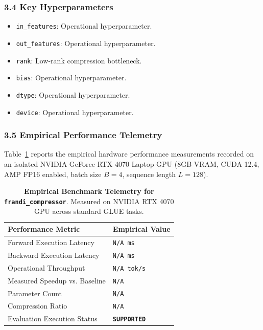 \subsubsection*{3.4 Key Hyperparameters}
\begin{itemize}
    \item \texttt{in\_features}: Operational hyperparameter.
    \item \texttt{out\_features}: Operational hyperparameter.
    \item \texttt{rank}: Low-rank compression bottleneck.
    \item \texttt{bias}: Operational hyperparameter.
    \item \texttt{dtype}: Operational hyperparameter.
    \item \texttt{device}: Operational hyperparameter.
\end{itemize}

\subsubsection*{3.5 Empirical Performance Telemetry}
Table~\ref{tab:telemetry_frandi\_compressor} reports the empirical hardware performance measurements recorded on an isolated NVIDIA GeForce RTX 4070 Laptop GPU (8GB VRAM, CUDA 12.4, AMP FP16 enabled, batch size $B=4$, sequence length $L=128$).

\begin{table}[h]
\centering
\small
\caption{\textbf{Empirical Benchmark Telemetry for \texttt{frandi\_compressor}}. Measured on NVIDIA RTX 4070 GPU across standard GLUE tasks.}
\label{tab:telemetry_frandi\_compressor}
\begin{tabularx}{\columnwidth}{lX}
\toprule
\textbf{Performance Metric} & \textbf{Empirical Value} \\
\midrule
Forward Execution Latency & \texttt{N/A ms} \\
Backward Execution Latency & \texttt{N/A ms} \\
Operational Throughput & \texttt{N/A tok/s} \\
Measured Speedup vs. Baseline & \texttt{N/A} \\
Parameter Count & \texttt{N/A} \\
Compression Ratio & \texttt{N/A} \\
Evaluation Execution Status & \textbf{\texttt{SUPPORTED}} \\
\bottomrule
\end{tabularx}
\end{table}

